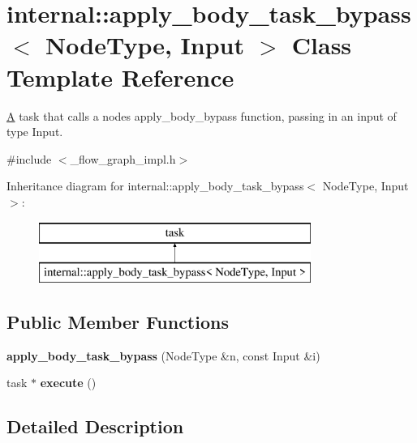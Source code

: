 \hypertarget{classinternal_1_1apply__body__task__bypass}{}\section{internal\+:\+:apply\+\_\+body\+\_\+task\+\_\+bypass$<$ Node\+Type, Input $>$ Class Template Reference}
\label{classinternal_1_1apply__body__task__bypass}


\hyperlink{structA}{A} task that calls a node\textquotesingle{}s apply\+\_\+body\+\_\+bypass function, passing in an input of type Input.  




{\ttfamily \#include $<$\+\_\+flow\+\_\+graph\+\_\+impl.\+h$>$}

Inheritance diagram for internal\+:\+:apply\+\_\+body\+\_\+task\+\_\+bypass$<$ Node\+Type, Input $>$\+:\begin{figure}[H]
\begin{center}
\leavevmode
\includegraphics[height=2.000000cm]{classinternal_1_1apply__body__task__bypass}
\end{center}
\end{figure}
\subsection*{Public Member Functions}
\begin{DoxyCompactItemize}
\item 
\hypertarget{classinternal_1_1apply__body__task__bypass_ad148b4570f81a29d7c6f40ac1da4e0b3}{}{\bfseries apply\+\_\+body\+\_\+task\+\_\+bypass} (Node\+Type \&n, const Input \&i)\label{classinternal_1_1apply__body__task__bypass_ad148b4570f81a29d7c6f40ac1da4e0b3}

\item 
\hypertarget{classinternal_1_1apply__body__task__bypass_a6533d447d6608afc19a9849a3dc87e59}{}task $\ast$ {\bfseries execute} ()\label{classinternal_1_1apply__body__task__bypass_a6533d447d6608afc19a9849a3dc87e59}

\end{DoxyCompactItemize}


\subsection{Detailed Description}

